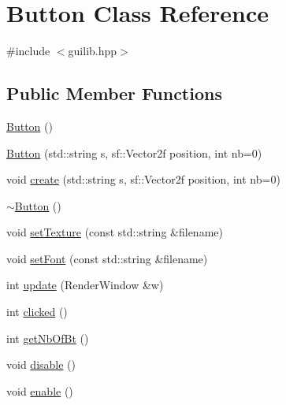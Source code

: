 \hypertarget{class_button}{}\section{Button Class Reference}
\label{class_button}


{\ttfamily \#include $<$guilib.\+hpp$>$}

\subsection*{Public Member Functions}
\begin{DoxyCompactItemize}
\item 
\hyperlink{class_button_a3b36df1ae23c58aedb9e15a713159459}{Button} ()
\item 
\hyperlink{class_button_a941cf3f1f95654c5b19b47e56e6cc635}{Button} (std\+::string s, sf\+::\+Vector2f position, int nb=0)
\item 
void \hyperlink{class_button_afa0ead4b7c469f56757562fcff6e7a3c}{create} (std\+::string s, sf\+::\+Vector2f position, int nb=0)
\item 
\hyperlink{class_button_a2a001eb9c3cc8ae54768a850dd345002}{$\sim$\+Button} ()
\item 
void \hyperlink{class_button_a10e78ae5d324ba437180714155928a11}{set\+Texture} (const std\+::string \&filename)
\item 
void \hyperlink{class_button_aa74e79c2f66153d3635cfeb05a4882fe}{set\+Font} (const std\+::string \&filename)
\item 
int \hyperlink{class_button_a15b5d672bee69cab7c02d7dbb3efc5db}{update} (Render\+Window \&w)
\item 
int \hyperlink{class_button_a39ef46d1d6ba89e67b47767cf774714c}{clicked} ()
\item 
int \hyperlink{class_button_ae80715b5f7c59eeb3677008053937732}{get\+Nb\+Of\+Bt} ()
\item 
void \hyperlink{class_button_abde3c72299314347169ef607ec7b7192}{disable} ()
\item 
void \hyperlink{class_button_a2829d6ad3d25929c6755a6f17cee7cb3}{enable} ()
\end{DoxyCompactItemize}
